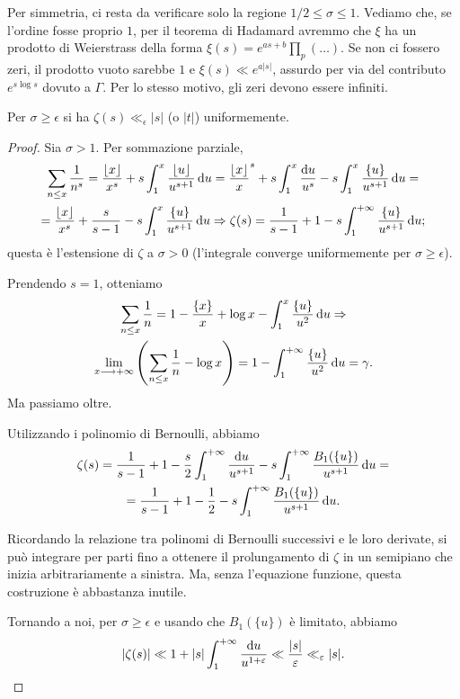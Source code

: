 Per simmetria, ci resta da verificare solo la regione $1/2 \le \sigma \le 1$. Vediamo che, se l'ordine fosse proprio $1$, per il teorema di Hadamard avremmo che $\xi$ ha un prodotto di Weierstrass della forma $\displaystyle \xi(s)=e^{as+b}\prod_p (\dots)$. Se non ci fossero zeri, il prodotto vuoto sarebbe $1$ e $\xi(s) \ll e^{a|s|}$, assurdo per via del contributo $e^{s\log{s}}$ dovuto a $\Gamma$. Per lo stesso motivo, gli zeri devono essere infiniti.

\begin{lm} \label{lls}
  Per $\sigma \ge \epsilon$ si ha $\zeta(s) \ll_{\epsilon} |s|$ (o $|t|$) uniformemente.
\end{lm}

\begin{proof}
  Sia $\sigma>1$. Per sommazione parziale,
  \begin{gather*}
    \sum_{n \le x} \frac{1}{n^s}=\frac{\lfloor x\rfloor}{x^s}+s\int_1^x \frac{\lfloor u\rfloor}{u^{s+1}}\mathop{}\!\mathrm{d} u=\frac{\lfloor x\rfloor}x^s+s\int_1^x \frac{\mathop{}\!\mathrm{d} u}{u^s}-s\int_1^x \frac{\{u\}}{u^{s+1}}\mathop{}\!\mathrm{d} u= \\
    =\frac{\lfloor x\rfloor}{x^s}+\frac{s}{s-1}-s\int_1^x \frac{\{u\}}{u^{s+1}}\mathop{}\!\mathrm{d} u \Rightarrow \zeta(s)=\frac{1}{s-1}+1-s\int_1^{+\infty} \frac{\{u\}}{u^{s+1}}\mathop{}\!\mathrm{d} u;
  \end{gather*}
  questa è l'estensione di $\zeta$ a $\sigma>0$ (l'integrale converge uniformemente per $\sigma \ge \epsilon$).
  \begin{oss}
    Prendendo $s=1$, otteniamo
    \begin{gather*}
      \sum_{n \le x} \frac{1}{n}=1-\frac{\{x\}}{x}+\log{x}-\int_1^x \frac{\{u\}}{u^2}\mathop{}\!\mathrm{d} u \Rightarrow \\
      \lim_{x \longrightarrow +\infty} \left(\sum_{n \le x} \frac{1}{n}-\log{x}\right)=1-\int_1^{+\infty} \frac{\{u\}}{u^2}\mathop{}\!\mathrm{d} u=\gamma.
    \end{gather*}
    Ma passiamo oltre.
  \end{oss}

  Utilizzando i polinomio di Bernoulli, abbiamo
  \begin{gather*}
    \zeta(s)=\frac{1}{s-1}+1-\frac{s}{2}\int_1^{+\infty} \frac{\mathop{}\!\mathrm{d} u}{u^{s+1}}-s\int_1^{+\infty} \frac{B_1(\{u\})}{u^{s+1}}\mathop{}\!\mathrm{d} u= \\
    =\frac{1}{s-1}+1-\frac{1}{2}-s\int_1^{+\infty} \frac{B_1(\{u\})}{u^{s+1}}\mathop{}\!\mathrm{d} u.
  \end{gather*}

  \begin{oss}
    Ricordando la relazione tra polinomi di Bernoulli successivi e le loro derivate, si può integrare per parti fino a ottenere il prolungamento di $\zeta$ in un semipiano che inizia arbitrariamente a sinistra. Ma, senza l'equazione funzione, questa costruzione è abbastanza inutile.
  \end{oss}

  Tornando a noi, per $\sigma \ge \epsilon$ e usando che $B_1(\{u\})$ è limitato, abbiamo
  $$|\zeta(s)| \ll 1+|s|\int_1^{+\infty} \frac{\mathop{}\!\mathrm{d} u}{u^{1+\varepsilon}} \ll \frac{|s|}{\varepsilon} \ll_{\varepsilon} |s|.$$
\end{proof}


